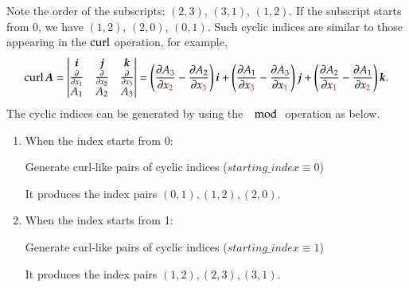 \documentclass[11pt, a4paper]{book}
\begin{document}
\begin{mycomment}
  Note the order of the subscripts: $(2,3)$, $(3,1)$, $(1,2)$. If the subscript starts from 0, we
  have $(1,2)$, $(2,0)$, $(0,1)$. Such cyclic indices are similar to those appearing in the $\operatorname{curl}$
  operation, for example,
  \begin{equation}
    \operatorname{curl}\boldsymbol{A} =
    \left\vert\begin{matrix}
        \boldsymbol{i} & \boldsymbol{j} & \boldsymbol{k} \\
        \frac{\partial }{\partial x_1} & \frac{\partial }{\partial x_2} & \frac{\partial }{\partial x_3} \\
        A_1 & A_2 & A_3
    \end{matrix}\right\vert = \left( \frac{\partial A_3}{\partial x_{\textcolor{red}{2}}} - \frac{\partial A_{2}}{\partial
      x_{\textcolor{red}{3}}} \right) \boldsymbol{i} + \left( \frac{\partial A_{1}}{\partial x_{\textcolor{red}{3}}} -
    \frac{\partial A_{3}}{\partial x_{\textcolor{red}{1}}} \right) \boldsymbol{j} + \left( \frac{\partial A_{2}}{\partial
      x_{\textcolor{red}{1}}} - \frac{\partial A_{1}}{\partial x_{\textcolor{red}{2}}} \right) \boldsymbol{k}.
  \end{equation}
  The cyclic indices can be generated by using the $\mod$ operation as below.
  \begin{enumerate}
  \item When the index starts from 0:
    \begin{breakablealgorithm}
      \caption{Generate curl-like pairs of cyclic indices ($starting\_index \equiv 0$)}
      \begin{algorithmic}[1]
        \EndFor
      \end{algorithmic}
    \end{breakablealgorithm}
    It produces the index pairs $(0,1), (1,2), (2,0)$.
  \item When the index starts from 1:
    \begin{breakablealgorithm}
      \caption{Generate curl-like pairs of cyclic indices ($starting\_index \equiv 1$)}
      \begin{algorithmic}[1]
        \EndFor
      \end{algorithmic}
    \end{breakablealgorithm}
    It produces the index pairs $(1,2),(2,3),(3,1)$.
  \end{enumerate}

\end{mycomment}
\end{document}

